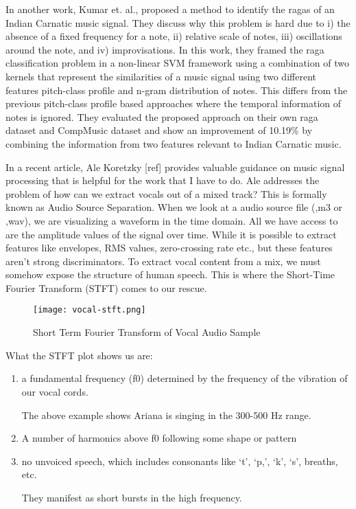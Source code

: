 In another work, Kumar et. al., proposed a method to identify the ragas of an Indian Carnatic music signal. They discuss why this problem is hard due to i) the absence of a fixed frequency for a note, ii) relative scale of notes, iii) oscillations around the note, and iv) improvisations. In this work, they framed the raga classification problem in a non-linear SVM framework using a combination of two kernels that represent the similarities of a music signal using two different features pitch-class profile and n-gram distribution of notes. This differs from the previous pitch-class profile based approaches where the temporal information of notes is ignored. They evaluated the proposed approach on their own raga dataset and CompMusic dataset and show an improvement of 10.19\% by combining the information from two features relevant to Indian Carnatic music.
\par
In a recent article, Ale Koretzky [ref] provides valuable guidance on music signal processing that is helpful for the work that I have to do. Ale addresses the problem of how can we extract vocals out of a mixed track? This is formally known as Audio Source Separation. When we look at a audio source file (,m3 or ,wav), we are visualizing a waveform in the time domain. All we have access to are the amplitude values of the signal over time. While it is possible to extract features like envelopes, RMS values, zero-crossing rate etc., but these features aren’t strong discriminators. To extract vocal content from a mix, we must somehow expose the structure of human speech. This is where the Short-Time Fourier Transform (STFT) comes to our rescue.
\par
\begin{figure}
  \caption{Short Term Fourier Transform of Vocal Audio Sample}
  \texttt{[image: vocal-stft.png]}
\end{figure}
What the STFT plot shows us are:
\begin{enumerate}[i]
  \item a fundamental frequency (f0) determined by the frequency of the vibration of our vocal cords.
  \par
  The above example shows Ariana is singing in the 300-500 Hz range.
  \item A number of harmonics above f0 following some shape or pattern
  \item no unvoiced speech, which includes consonants like `t', `p,', `k', `s', breaths, etc. \par
  They manifest as short bursts in the high frequency.
\end{enumerate}

